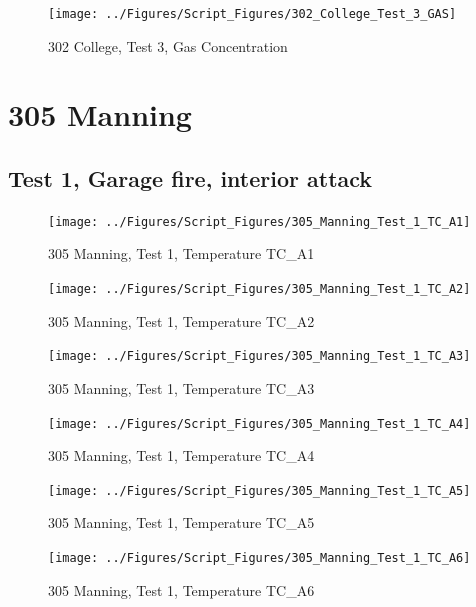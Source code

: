 \documentclass[12pt,oneside]{book}
\begin{document}
\begin{figure}[!ht]
\texttt{[image: ../Figures/Script\_Figures/302\_College\_Test\_3\_GAS]}
\caption{302 College, Test 3, Gas Concentration}
\label{fig:302_College_Test_3_GAS}
\end{figure}


\clearpage


\section{305 Manning}

\subsection{Test 1, Garage fire, interior attack}

\begin{figure}[!ht]
\texttt{[image: ../Figures/Script\_Figures/305\_Manning\_Test\_1\_TC\_A1]}
\caption{305 Manning, Test 1, Temperature TC\_A1}
\label{fig:305_Manning_Test_1_TC_A1}
\end{figure}

\begin{figure}[!ht]
\texttt{[image: ../Figures/Script\_Figures/305\_Manning\_Test\_1\_TC\_A2]}
\caption{305 Manning, Test 1, Temperature TC\_A2}
\label{fig:305_Manning_Test_1_TC_A2}
\end{figure}

\begin{figure}[!ht]
\texttt{[image: ../Figures/Script\_Figures/305\_Manning\_Test\_1\_TC\_A3]}
\caption{305 Manning, Test 1, Temperature TC\_A3}
\label{fig:305_Manning_Test_1_TC_A3}
\end{figure}

\begin{figure}[!ht]
\texttt{[image: ../Figures/Script\_Figures/305\_Manning\_Test\_1\_TC\_A4]}
\caption{305 Manning, Test 1, Temperature TC\_A4}
\label{fig:305_Manning_Test_1_TC_A4}
\end{figure}

\begin{figure}[!ht]
\texttt{[image: ../Figures/Script\_Figures/305\_Manning\_Test\_1\_TC\_A5]}
\caption{305 Manning, Test 1, Temperature TC\_A5}
\label{fig:305_Manning_Test_1_TC_A5}
\end{figure}

\begin{figure}[!ht]
\texttt{[image: ../Figures/Script\_Figures/305\_Manning\_Test\_1\_TC\_A6]}
\caption{305 Manning, Test 1, Temperature TC\_A6}
\label{fig:305_Manning_Test_1_TC_A6}
\end{figure}
\end{document}
